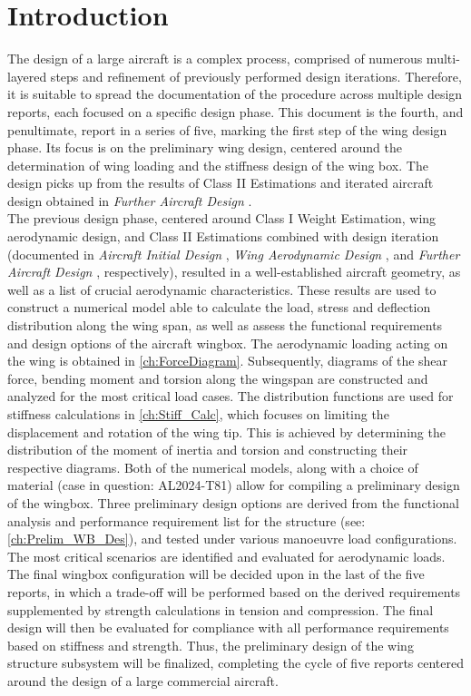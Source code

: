 \chapter{Introduction}
The design of a large aircraft is a complex process, comprised of numerous multi-layered steps and refinement of previously performed design iterations. Therefore, it is suitable to spread the documentation of the procedure across multiple design reports, each focused on a specific design phase. This document is the fourth, and penultimate, report in a series of five, marking the first step of the wing design phase. Its focus is on the preliminary wing design, centered around the determination of wing loading and the stiffness design of the wing box. The design picks up from the results of Class II Estimations and iterated aircraft design obtained in \textit{Further Aircraft Design} \cite{Koppejan2024WorkDesign}.\\

\noindent
    The previous design phase, centered around Class I Weight Estimation, wing aerodynamic design, and Class II Estimations combined with design iteration (documented in \textit{Aircraft Initial Design} \cite{Koppejan2024Aircraft1}, \textit{Wing Aerodynamic Design} \cite{Koppejan2024WingDesign}, and \textit{Further Aircraft Design} \cite{Koppejan2024WorkDesign}, respectively), resulted in a well-established aircraft geometry, as well as a list of crucial aerodynamic characteristics. These results are used to construct a numerical model able to calculate the load, stress and deflection distribution along the wing span, as well as assess the functional requirements and design options of the aircraft wingbox. The aerodynamic loading acting on the wing is obtained in \autoref{ch:ForceDiagram}. Subsequently, diagrams of the shear force, bending moment and torsion along the wingspan are constructed and analyzed for the most critical load cases. The distribution functions are used for stiffness calculations in \autoref{ch:Stiff_Calc}, which focuses on limiting the displacement and rotation of the wing tip. This is achieved by determining the distribution of the moment of inertia and torsion and constructing their respective diagrams. Both of the numerical models, along with a choice of material (case in question: AL2024-T81) allow for compiling a preliminary design of the wingbox. Three preliminary design options are derived from the functional analysis and performance requirement list for the structure (see: \autoref{ch:Prelim_WB_Des}), and tested under various manoeuvre load configurations. The most critical scenarios are identified and evaluated for aerodynamic loads.\\
    
    \noindent The final wingbox configuration will be decided upon in the last of the five reports, in which a trade-off will be performed based on the derived requirements supplemented by strength calculations in tension and compression. The final design will then be evaluated for compliance with all performance requirements based on stiffness and strength. Thus, the preliminary design of the wing structure subsystem will be finalized, completing the cycle of five reports centered around the design of a large commercial aircraft.